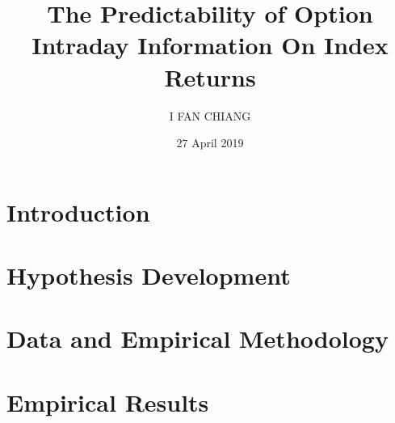 \documentclass[oneside,12pt]{article}
\title{\textbf{The Predictability of Option Intraday Information On Index Returns}}
\author{I FAN CHIANG}
\date{27 April 2019}
\begin{document}
\maketitle

\begin{abstract}
\centering

\end{abstract}


\fontsize{13pt}{18pt}\selectfont
\section{Introduction}\label{ch:Introduction}



\fontsize{13pt}{18pt}\selectfont
\section{Hypothesis Development}


\fontsize{13pt}{18pt}\selectfont
\section{Data and Empirical Methodology}


\fontsize{13pt}{18pt}\selectfont
\section{Empirical Results}



\newpage
\printbibliography
\end{document}
